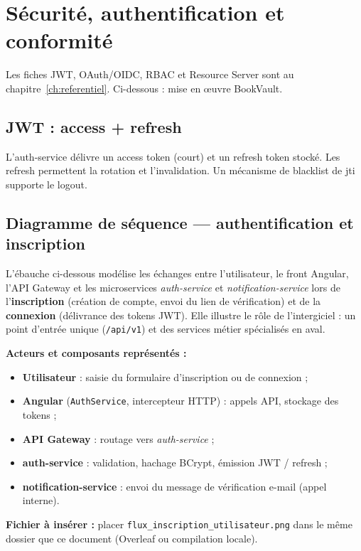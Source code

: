 \documentclass[12pt,a4paper]{report}
\begin{document}
\chapter{Sécurité, authentification et conformité}

Les fiches JWT, OAuth/OIDC, RBAC et Resource Server sont au chapitre~\ref{ch:referentiel}. Ci-dessous : mise en œuvre BookVault.

\section{JWT : access + refresh}
L'auth-service délivre un access token (court) et un refresh token stocké. Les refresh permettent la rotation et l'invalidation. Un mécanisme de blacklist de jti supporte le logout.\par

\section{Diagramme de séquence — authentification et inscription}
\label{sec:diagramme-seq-auth}

L'ébauche ci-dessous modélise les échanges entre l'utilisateur, le front Angular, l'API Gateway et les microservices \textit{auth-service} et \textit{notification-service} lors de l'\textbf{inscription} (création de compte, envoi du lien de vérification) et de la \textbf{connexion} (délivrance des tokens JWT). Elle illustre le rôle de l'intergiciel : un point d'entrée unique (\texttt{/api/v1}) et des services métier spécialisés en aval.\par

\textbf{Acteurs et composants représentés :}
\begin{itemize}
  \item \textbf{Utilisateur} : saisie du formulaire d'inscription ou de connexion ;
  \item \textbf{Angular} (\texttt{AuthService}, intercepteur HTTP) : appels API, stockage des tokens ;
  \item \textbf{API Gateway} : routage vers \textit{auth-service} ;
  \item \textbf{auth-service} : validation, hachage BCrypt, émission JWT / refresh ;
  \item \textbf{notification-service} : envoi du message de vérification e-mail (appel interne).
\end{itemize}

\textbf{Fichier à insérer :} placer \texttt{flux\_inscription\_utilisateur.png} dans le même dossier que ce document (Overleaf ou compilation locale).\par
\end{document}
